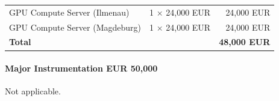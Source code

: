 \documentclass[11pt]{article}
\begin{document}
\begin{table}[h!]
\centering
\begin{tabular}{lrr}
 GPU Compute Server (Ilmenau)
 & 1 $\times$ 24,000 EUR & 24,000 EUR  \\
 GPU Compute Server (Magdeburg)
 & 1 $\times$ 24,000 EUR & 24,000 EUR  \\
 \hline
 \textbf{Total} &  &   \textbf{48,000 EUR}  \\
\end{tabular}
\end{table}

\paragraph{Major Instrumentation EUR 50,000}
Not applicable. 




\end{document}
